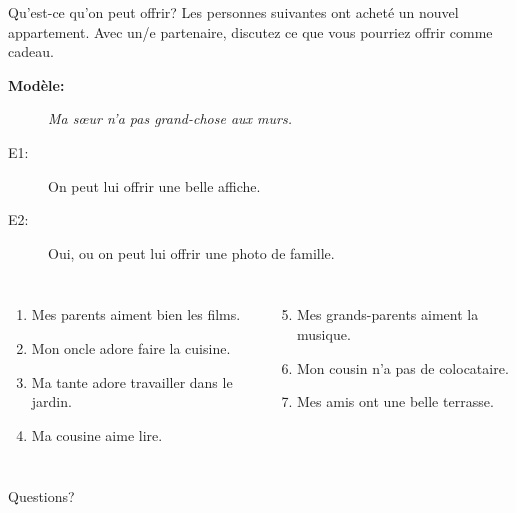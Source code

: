 \documentclass{beamer}
\begin{document}
  \begin{frame}{Qu'est-ce qu'on peut offrir?}
    Les personnes suivantes ont acheté un nouvel appartement.
    Avec un/e partenaire, discutez ce que vous pourriez offrir comme cadeau.
    \begin{description}
      \item[\textbf{Modèle:}] \emph{Ma sœur n'a pas grand-chose aux murs.}
      \item[E1:] On peut lui offrir une belle affiche.
      \item[E2:] Oui, ou on peut lui offrir une photo de famille.
    \end{description}
    \begin{columns}[t]
        \begin{enumerate}
          \item Mes parents aiment bien les films.
          \item Mon oncle adore faire la cuisine.
          \item Ma tante adore travailler dans le jardin.
          \item Ma cousine aime lire.
        \end{enumerate}
        \begin{enumerate}
          \setcounter{enumi}{4}
          \item Mes grands-parents aiment la musique.
          \item Mon cousin n'a pas de colocataire.
          \item Mes amis ont une belle terrasse.
        \end{enumerate}
    \end{columns}
  \end{frame}

  \begin{frame}{}
    \begin{center}
      \Large Questions?
    \end{center}
  \end{frame}
\end{document}

